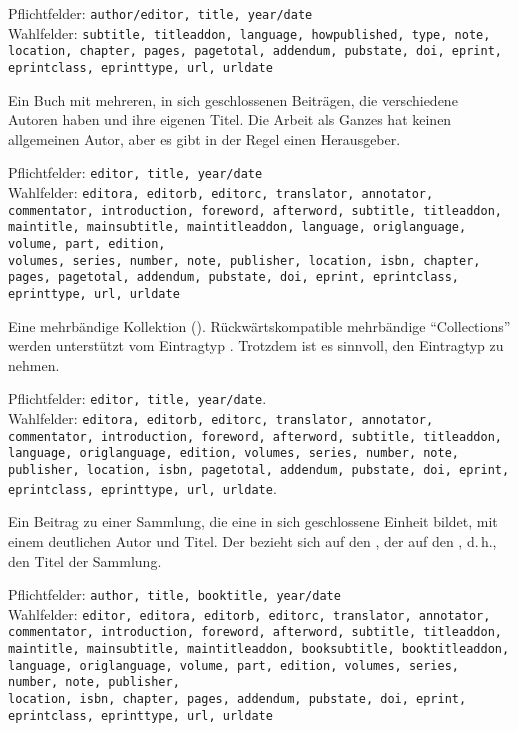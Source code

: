 \documentclass{ltxdockit}[2011/03/25]
\begin{document}
\begin{typelist}
Pflichtfelder: \texttt{author/editor, title, year/date}\\ Wahlfelder:
\texttt{subtitle, titleaddon,
language, howpublished, type, note, lo\-cation, chapter, pages, pagetotal,
addendum, pubstate, doi, eprint,\\ eprintclass, eprinttype, url, urldate}


Ein Buch mit mehreren, in sich geschlossenen Beiträgen,
die verschiedene Autoren haben und ihre eigenen Titel. Die Arbeit als Ganzes hat
keinen allgemeinen Autor, aber es gibt in der Regel einen Herausgeber. 

Pflichtfelder: \texttt{editor, title, year/date}\\ Wahlfelder: \texttt{editora, editorb, 
editorc,
translator, annotator, commentator, introduction, foreword, afterword, subtitle,
titleaddon, maintitle, main\-subtitle, maintitleaddon, language, origlanguage,
volume, part, edition,\\ volumes, series, number, note, publisher, location, isbn,
chapter, pages, pagetotal, addendum, pubstate, doi, eprint, eprintclass,
eprinttype, url, urldate}


Eine mehrbändige Kollektion (). Rückwärtskompatible
mehrbändige "`Collections"' werden unterstützt vom Eintragtyp
. Trotzdem ist es sinnvoll, den Eintragtyp
 zu nehmen.

Pflichtfelder: \texttt{editor, title, year/date}.\\
Wahlfelder: \texttt{editora, editorb, editorc, translator, annotator,
commentator, introduction, foreword, afterword, subtitle, titleaddon,
language, origlanguage, edition, volumes, series, number, note, publisher,
location, isbn, pagetotal, addendum, pubstate, doi, eprint, eprintclass,
eprinttype, url, urldate}.



Ein Beitrag zu einer Sammlung, die eine in sich
geschlossene Einheit bildet, mit einem deutlichen Autor und Titel. Der
 bezieht sich auf den , der 
auf den , d.\,h., den Titel der Sammlung. 

Pflichtfelder: \texttt{author, title, booktitle, year/date}\\
Wahlfelder: \texttt{editor, editora, editorb,
editorc, translator, annotator, commentator, introduction, foreword, afterword,
subtitle, titleaddon, maintitle, main\-subtitle, maintitleaddon, booksubtitle,
booktitleaddon, language, orig\-language, volume, part, edition, volumes, series,
number, note, publisher,\\ location, isbn, chapter, pages, addendum, pubstate,
doi, eprint, eprint\-class, eprinttype, url, urldate}


\end{typelist}
\end{document}

